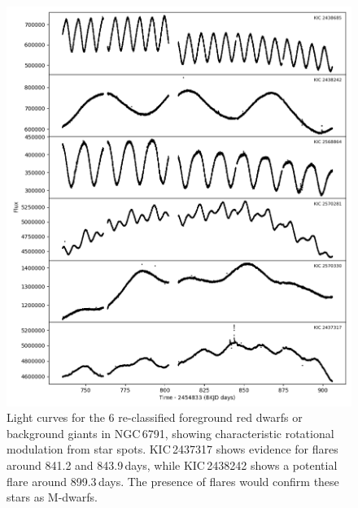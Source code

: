 \begin{figure}
    \centering
    \includegraphics[height=\linewidth]{Chapter5/Rot_mod_5_q89.png}
    \caption[Light curves for 6 re-classified foreground red dwarfs or background giants in NGC 6791]{Light curves for the 6 re-classified foreground red dwarfs or background giants in NGC\,6791, showing characteristic rotational modulation from star spots. KIC\,2437317 shows evidence for flares around 841.2 and 843.9\,days, while KIC\,2438242 shows a potential flare around 899.3\,days. The presence of flares would confirm these stars as M-dwarfs.}
    \label{fig:reddwarfs}
\end{figure}

